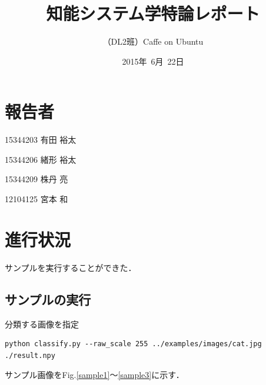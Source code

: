 \documentclass[a4paper,10pt]{jsarticle}
\title{知能システム学特論レポート}
\author{
（DL2班）Caffe on Ubuntu\\
}
\date{2015年\ 6月\ 22日}
\begin{document}
\maketitle
\section{報告者}
\begin{list}{}{}
 \item 15344203\hspace{0.5cm} 有田 裕太
 \item 15344206\hspace{0.5cm} 緒形 裕太
 \item 15344209\hspace{0.5cm} 株丹 亮
 \item 12104125\hspace{0.5cm} 宮本 和
\end{list}

\section{進行状況}
サンプルを実行することができた．

\subsection{サンプルの実行}

分類する画像を指定
\begin{lstlisting}[basicstyle=\ttfamily\footnotesize, frame=single]
python classify.py --raw_scale 255 ../examples/images/cat.jpg ./result.npy
\end{lstlisting}

サンプル画像をFig.\ref{sample1}〜\ref{sample3}に示す．
\end{document}
